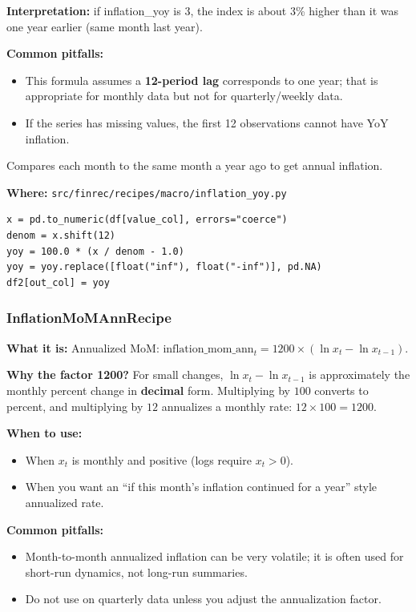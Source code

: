 \documentclass[11pt,a4paper]{article}
\begin{document}
\textbf{Interpretation:} if inflation\_yoy is 3, the index is about 3\% higher than it was one year earlier (same month last year).

\textbf{Common pitfalls:}
\begin{itemize}[leftmargin=2em]
  \item This formula assumes a \textbf{12-period lag} corresponds to one year; that is appropriate for monthly data but not for quarterly/weekly data.
  \item If the series has missing values, the first 12 observations cannot have YoY inflation.
\end{itemize}

\begin{intuitionbox}
Compares each month to the same month a year ago to get annual inflation.
\end{intuitionbox}

\textbf{Where:} \texttt{src/finrec/recipes/macro/inflation\_yoy.py}

\begin{lstlisting}
x = pd.to_numeric(df[value_col], errors="coerce")
denom = x.shift(12)
yoy = 100.0 * (x / denom - 1.0)
yoy = yoy.replace([float("inf"), float("-inf")], pd.NA)
df2[out_col] = yoy
\end{lstlisting}

\subsubsection{InflationMoMAnnRecipe}\label{sec:inflation-mom}

\textbf{What it is:} Annualized MoM: $\text{inflation\_mom\_ann}_t = 1200 \times (\ln x_t - \ln x_{t-1})$.

\textbf{Why the factor 1200?} For small changes, \(\ln x_t - \ln x_{t-1}\) is approximately the monthly percent change in \textbf{decimal} form. Multiplying by \(100\) converts to percent, and multiplying by \(12\) annualizes a monthly rate: \(12 \times 100 = 1200\).

\textbf{When to use:}
\begin{itemize}[leftmargin=2em]
  \item When \(x_t\) is monthly and positive (logs require \(x_t > 0\)).
  \item When you want an ``if this month’s inflation continued for a year'' style annualized rate.
\end{itemize}

\textbf{Common pitfalls:}
\begin{itemize}[leftmargin=2em]
  \item Month-to-month annualized inflation can be very volatile; it is often used for short-run dynamics, not long-run summaries.
  \item Do not use on quarterly data unless you adjust the annualization factor.
\end{itemize}
\end{document}
